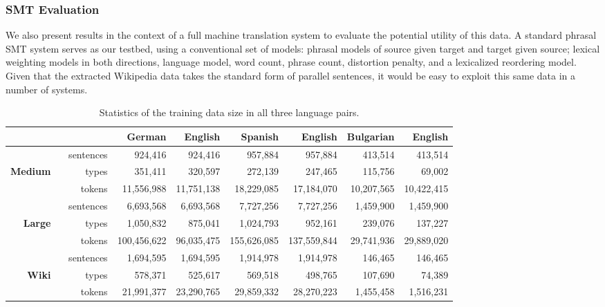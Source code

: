 \documentclass[11pt,letterpaper]{article}
\begin{document}
\subsubsection{SMT Evaluation}

We also present results in the context of a full machine translation system
to evaluate the potential utility of this data.  A standard
phrasal SMT system \cite{Koehn03} serves as our testbed, using
a conventional set of models: phrasal models of source given target and
target given source; lexical weighting models in both directions, language
model, word count, phrase count, distortion penalty, and a lexicalized
reordering model.  Given that the extracted Wikipedia data takes the
standard form of parallel sentences, it would be easy to exploit this same
data in a number of systems.

\begin{table}[ht]
\begin{center}
\begin{tabular}{|rr||r|r||r|r||r|r|}
\hline
      &                & German        & English       & Spanish       & English      & Bulgarian    & English   \\
\hline
      & sentences     & 924,416       & 924,416       & 957,884       & 957,884      & 413,514      & 413,514   \\
\textbf{Medium} \
      & types     & 351,411       & 320,597       & 272,139       & 247,465      & 115,756      & 69,002    \\
      & tokens    & 11,556,988    & 11,751,138    & 18,229,085    & 17,184,070   & 10,207,565   & 10,422,415\\
\hline
      & sentences      & 6,693,568     & 6,693,568     & 7,727,256     & 7,727,256    & 1,459,900    & 1,459,900 \\
\textbf{Large} \
      &      types     & 1,050,832     & 875,041       & 1,024,793     & 952,161      & 239,076      & 137,227   \\
      &      tokens    & 100,456,622   & 96,035,475    & 155,626,085   & 137,559,844  & 29,741,936   & 29,889,020\\
\hline
      & sentences      & 1,694,595     & 1,694,595     & 1,914,978     & 1,914,978    & 146,465      & 146,465   \\
\textbf{Wiki}  \
      &      types     & 578,371       & 525,617       & 569,518       & 498,765      & 107,690      & 74,389    \\
      &      tokens    & 21,991,377    & 23,290,765    & 29,859,332    & 28,270,223   & 1,455,458    & 1,516,231 \\
\hline
\end{tabular}
\end{center}
\caption{Statistics of the training data size in all three language pairs.}
\label{table:mtTrainStats}
\end{table}
\end{document}
